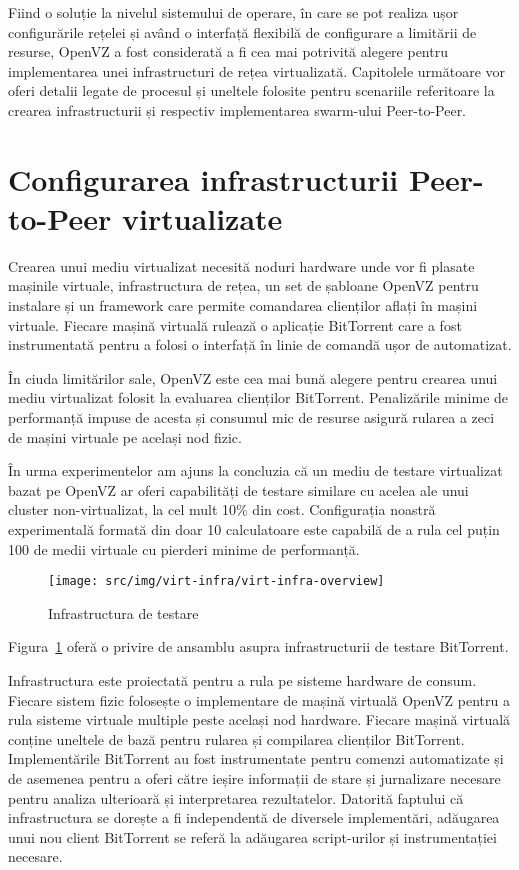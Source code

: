 Fiind o soluție la nivelul sistemului de operare, în care se pot realiza
ușor configurările rețelei și având o interfață flexibilă de configurare
a limitării de resurse, OpenVZ a fost considerată a fi cea mai potrivită
alegere pentru implementarea unei infrastructuri de rețea virtualizată.
Capitolele următoare vor oferi detalii legate de procesul și uneltele
folosite pentru scenariile referitoare la crearea infrastructurii și
respectiv implementarea swarm-ului Peer-to-Peer.

\section{Configurarea infrastructurii Peer-to-Peer virtualizate}
\label{sec:virt-infra:setup}

Crearea unui mediu virtualizat necesită noduri hardware unde vor fi
plasate mașinile virtuale, infrastructura de rețea, un set de șabloane
OpenVZ pentru instalare și un framework care permite comandarea clienților
aflați în mașini virtuale. Fiecare mașină virtuală rulează o aplicație
BitTorrent care a fost instrumentată pentru a folosi o interfață în linie
de comandă ușor de automatizat.

În ciuda limitărilor sale, OpenVZ este cea mai bună alegere pentru crearea
unui mediu virtualizat folosit la evaluarea clienților BitTorrent. 
Penalizările minime de performanță impuse de acesta și consumul mic de 
resurse asigură rularea a zeci de mașini virtuale pe același nod fizic.

În urma experimentelor am ajuns la concluzia că un mediu de testare
virtualizat bazat pe OpenVZ ar oferi capabilități de testare similare cu
acelea ale unui cluster non-virtualizat, la cel mult 10\% din cost.
Configurația noastră experimentală formată din doar 10 calculatoare este
capabilă de a rula cel puțin 100 de medii virtuale cu pierderi minime
de performanță.

\begin{figure}
  \begin{center}
    \texttt{[image: src/img/virt-infra/virt-infra-overview]}
  \end{center}
  \caption{Infrastructura de testare}
  \label{fig:virt-infra:infrastructure-overview}
\end{figure}

Figura~\ref{fig:virt-infra:infrastructure-overview} oferă o privire
de ansamblu asupra infrastructurii de testare BitTorrent.

Infrastructura este proiectată pentru a rula pe sisteme hardware de
consum. Fiecare sistem fizic folosește o implementare de mașină virtuală
OpenVZ pentru a rula sisteme virtuale multiple peste același nod hardware.
Fiecare mașină virtuală conține uneltele de bază pentru rularea și compilarea
clienților BitTorrent. Implementările BitTorrent au fost instrumentate pentru
comenzi automatizate și de asemenea pentru a oferi către ieșire informații
de stare și jurnalizare necesare pentru analiza ulterioară și interpretarea
rezultatelor. Datorită faptului că infrastructura se dorește a fi
independentă de diversele implementări, adăugarea unui nou client BitTorrent
se referă la adăugarea script-urilor și instrumentației necesare.

